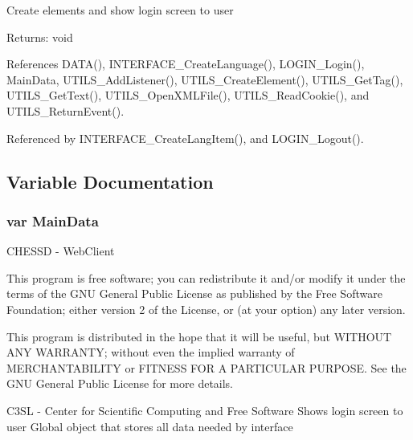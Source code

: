 Create elements and show login screen to user

\begin{Desc}
\item[Returns:]void \end{Desc}


References DATA(), INTERFACE\_\-CreateLanguage(), LOGIN\_\-Login(), MainData, UTILS\_\-AddListener(), UTILS\_\-CreateElement(), UTILS\_\-GetTag(), UTILS\_\-GetText(), UTILS\_\-OpenXMLFile(), UTILS\_\-ReadCookie(), and UTILS\_\-ReturnEvent().

Referenced by INTERFACE\_\-CreateLangItem(), and LOGIN\_\-Logout().

\subsection{Variable Documentation}
\subsubsection{\setlength{\rightskip}{0pt plus 5cm}var {\bf MainData}}\label{interface_2login_8js_be4e3545ee0ac3ff17e7aecaff4fce1a}


CHESSD - WebClient

This program is free software; you can redistribute it and/or modify it under the terms of the GNU General Public License as published by the Free Software Foundation; either version 2 of the License, or (at your option) any later version.

This program is distributed in the hope that it will be useful, but WITHOUT ANY WARRANTY; without even the implied warranty of MERCHANTABILITY or FITNESS FOR A PARTICULAR PURPOSE. See the GNU General Public License for more details.

C3SL - Center for Scientific Computing and Free Software Shows login screen to user Global object that stores all data needed by interface 

